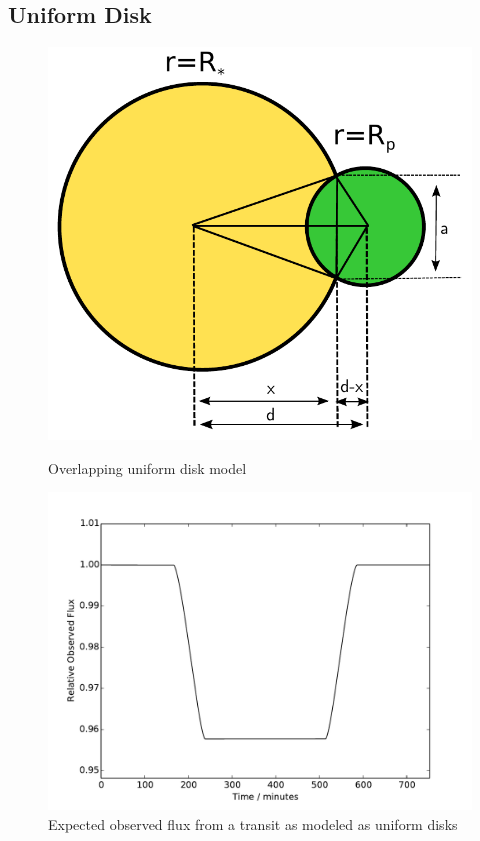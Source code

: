 \subsection{Uniform Disk}
\begin{figure}[ht]
    \centering
    \begin{minipage}[b]{\figwidth}
        \includegraphics[width=\textwidth]{images/uniform_disk_overlap.pdf}
        \caption{Overlapping uniform disk model}
        \label{fig:uniform_overlap}
    \end{minipage}\quad\quad
    \begin{minipage}[b]{\figwidth}
        \includegraphics[width=\textwidth]{images/uniform_disk_model.pdf}
        \caption{Expected observed flux from a transit as modeled as uniform disks}
        \label{fig:uniform_disk_model}
        \end{minipage}
\end{figure}

